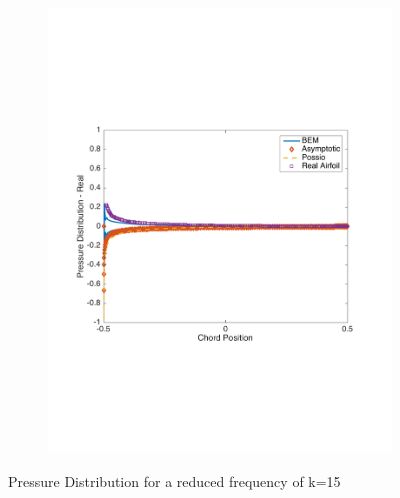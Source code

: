 \documentclass{article}
\begin{document}
\begin{figure}[h]
\begin{subfigure}{0.33\textwidth}
	\includegraphics[width = \textwidth, height=0.2\textheight]{pressure_k15real}
\end{subfigure}%
\caption{Pressure Distribution for a reduced frequency of k=15}
\end{figure}
\end{document}
